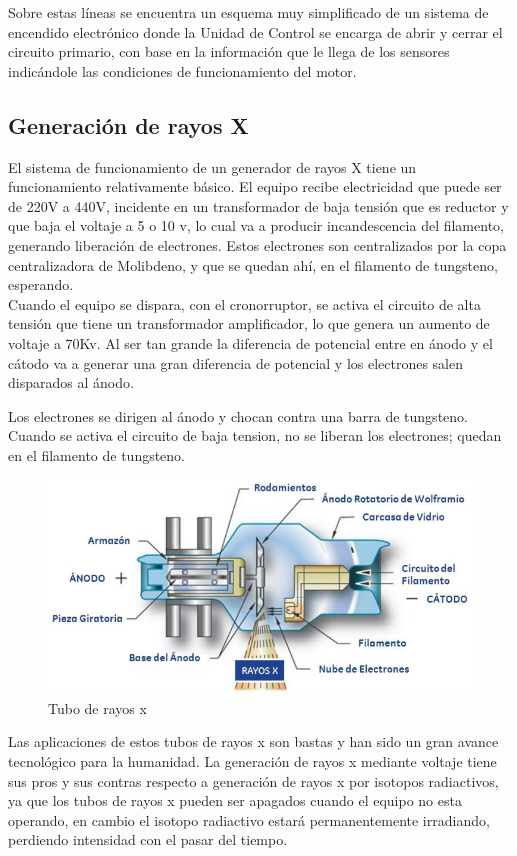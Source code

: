 Sobre estas líneas se encuentra un esquema muy simplificado de
un sistema de encendido electrónico donde la Unidad de Control se
encarga de abrir y cerrar el circuito primario, con base en la información
que le llega de los sensores indicándole las condiciones de
funcionamiento del motor. \cite{ignicion}

\subsection{Generación de rayos X}

El sistema de funcionamiento de un generador de rayos X tiene un funcionamiento relativamente básico.  El equipo recibe electricidad que puede ser de 220V a 440V, incidente en un transformador de baja tensión que es reductor y que baja el voltaje a 5 o 10 v, lo cual va a producir incandescencia del filamento, generando liberación de electrones. Estos electrones son centralizados por la copa centralizadora de Molibdeno, y que se quedan ahí, en el filamento de tungsteno, esperando. \\

Cuando el equipo se dispara, con el cronorruptor, se activa el circuito de alta tensión que tiene un transformador amplificador, lo que genera un aumento de voltaje a 70Kv. Al ser tan grande la diferencia de potencial entre en ánodo y el cátodo va a generar una gran diferencia de potencial y los electrones salen disparados al ánodo. 

Los electrones se dirigen al ánodo y chocan contra una barra de tungsteno. Cuando se activa el circuito de baja tension, no se liberan los electrones; quedan en el filamento de tungsteno.\\

\begin{figure}[H]
\centering
\includegraphics[width=12cm]{capitulo3/figs/rayos.png}
\caption{ Tubo de rayos x}
\end{figure}

Las aplicaciones de estos tubos de rayos x son bastas y han sido un gran avance tecnológico para la humanidad. La generación de rayos x mediante voltaje tiene sus pros y sus contras respecto a generación de rayos x por isotopos radiactivos, ya que los tubos de rayos x pueden ser apagados cuando el equipo no esta operando, en cambio el isotopo radiactivo estará permanentemente irradiando, perdiendo intensidad con el pasar del tiempo.  \\


